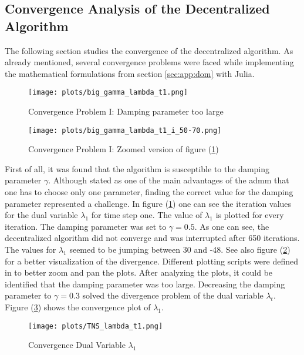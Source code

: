 \subsection{Convergence Analysis of the Decentralized Algorithm}

The following section studies the convergence of the decentralized algorithm. As already mentioned, several convergence problems were faced while implementing the mathematical formulations from section \ref{sec:app:dom} with Julia. \\

\begin{figure}[h!]
	\centering
	\texttt{[image: plots/big\_gamma\_lambda\_t1.png]}
	\caption{Convergence Problem I: Damping parameter too large}
	\label{fig:conv-problem-1}
\end{figure}

\begin{figure}[h!]
	\centering
	\texttt{[image: plots/big\_gamma\_lambda\_t1\_i\_50-70.png]}
	\caption{Convergence Problem I: Zoomed version of figure (\ref{fig:conv-problem-1})}
	\label{fig:conv-problem-1-zoom}
\end{figure}

First of all, it was found that the algorithm is susceptible to the damping parameter $\gamma$. Although stated as one of the main advantages of the \gls{admm} that one has to choose only one parameter, finding the correct value for the damping parameter represented a challenge. In figure (\ref{fig:conv-problem-1}) one can see the iteration values for the dual variable $\lambda_1$ for time step one. The value of $\lambda_1$ is plotted for every iteration. The damping parameter was set to $\gamma = 0.5$. As one can see, the decentralized algorithm did not converge and was interrupted after 650 iterations. The values for $\lambda_1$ seemed to be jumping between 30 and -48. See also figure (\ref{fig:conv-problem-1-zoom}) for a better visualization of the divergence. Different plotting scripts were defined in  to better zoom and pan the plots. After analyzing the plots, it could be identified that the damping parameter was too large. Decreasing the damping parameter to $\gamma = 0.3$ solved the divergence problem of the dual variable $\lambda_t$. Figure (\ref{fig:conv-lambda}) shows the convergence plot of $\lambda_1$. \\

\begin{figure}[h!]
	\centering
	\texttt{[image: plots/TNS\_lambda\_t1.png]}
	\caption{Convergence Dual Variable $\lambda_1$}
	\label{fig:conv-lambda}
\end{figure}

